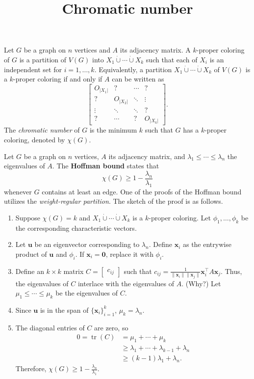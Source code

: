 \documentclass{article}
\title{Chromatic number}
\date{\vspace{-1cm}}
\newcommand{\trans}{^\top}
\newcommand{\dunion}{\mathbin{\dot\cup}}
\newcommand{\bzero}{\mathbf{0}}
\newcommand{\bx}{\mathbf{x}}
\newcommand{\bu}{\mathbf{u}}
\newcommand{\tr}{\operatorname{tr}}
\theoremstyle{definition}
\begin{document}
\maketitle
\large

Let $G$ be a graph on $n$ vertices and $A$ its adjacency matrix.  A $k$-proper coloring of $G$ is a partition of $V(G)$ into $X_1\dunion \cdots \dunion X_k$ such that each of $X_i$ is an independent set for $i = 1,\ldots, k$.  Equivalently, a partition $X_1\dunion \cdots \dunion X_k$ of $V(G)$ is a $k$-proper coloring if and only if $A$ can be written as 
\[\begin{bmatrix}
 O_{|X_1|} & ? & \cdots & ? \\
 ? & O_{|X_2|} & \ddots & \vdots \\
 \vdots & \ddots & \ddots & ? \\
 ? & \cdots & ? & O_{|X_k|} 
\end{bmatrix}.\]
The \emph{chromatic number} of $G$ is the minimum $k$ such that $G$ has a $k$-proper coloring, denoted by $\chi(G)$.

Let $G$ be a graph on $n$ vertices, $A$ its adjacency matrix, and $\lambda_1\leq \cdots \leq \lambda_n$ the eigenvalues of $A$.  The \textbf{Hoffman bound} states that 
\[\chi(G) \geq 1 - \frac{\lambda_n}{\lambda_1}\]
whenever $G$ contains at least an edge.  One of the proofs of the Hoffman bound utilizes the \emph{weight-regular partition}.  The sketch of the proof is as follows.
\begin{enumerate}
\item Suppose $\chi(G) = k$ and $X_1\dunion \cdots \dunion X_k$ is a $k$-proper coloring.  Let $\phi_1,\ldots,\phi_k$ be the corresponding characteristic vectors.
\item Let $\bu$ be an eigenvector corresponding to $\lambda_n$.  Define $\bx_i$ as the entrywise product of $\bu$ and $\phi_i$.  If $\bx_i = \bzero$, replace it with $\phi_i$.
\item Define an $k\times k$ matrix $C = \begin{bmatrix} c_{ij} \end{bmatrix}$ such that $c_{ij} = \frac{1}{\|\bx_i\|\|\bx_j\|}\bx_i\trans A\bx_j$.  Thus, the eigenvalues of $C$ interlace with the eigenvalues of $A$.  (Why?)  Let $\mu_1 \leq \cdots \leq \mu_k$ be the eigenvalues of $C$.
\item Since $\bu$ is in the span of $\{\bx_i\}_{i=1}^k$, $\mu_k = \lambda_n$.  
\item The diagonal entries of $C$ are zero, so 
\[\begin{aligned} 
 0 = \tr(C) &= \mu_1 + \cdots + \mu_k \\
 &\geq \lambda_1 + \cdots + \lambda_{k-1} + \lambda_n \\
 &\geq (k-1)\lambda_1 + \lambda_n.
\end{aligned}\]
Therefore, $\chi(G) \geq 1 - \frac{\lambda_n}{\lambda_1}$.  
\end{enumerate}
\end{document}
